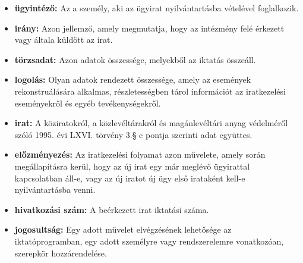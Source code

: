 \documentclass[
]{thesis-ekf}
\theoremstyle{definition}
\theoremstyle{remark}
\begin{document}
\begin{itemize}[leftmargin=0pt]
	\item[] \textbf{ügyintéző: }Az a személy, aki az ügyirat nyilvántartásba vételével foglalkozik.
	\item[] \textbf{irány: }Azon jellemző, amely megmutatja, hogy az intézmény felé érkezett vagy általa küldött  az irat.
	\item[] \textbf{törzsadat: }Azon adatok összessége, melyekből az iktatás összeáll.
	\item[] \textbf{logolás: }Olyan adatok rendezett összessége, amely az események rekonstruálására alkalmas, részletességben tárol információt az iratkezelési eseményekről és egyéb tevékenységekről.
	\item[] \textbf{irat: }A köziratokról, a közlevéltárakról és magánlevéltári anyag védelméről szóló 1995. évi LXVI. törvény 3.§ c pontja szerinti adat együttes.
	\item[] \textbf{előzményezés: }Az iratkezelési folyamat azon művelete, amely során megállapításra kerül, hogy az új irat egy már meglévő ügyirattal kapcsolatban áll-e, vagy az új iratot új ügy első irataként kell-e nyilvántartásba venni.
	\item[] \textbf{hivatkozási szám: }A beérkezett irat iktatási száma.
	\item[] \textbf{jogosultság:  }Egy adott művelet elvégzésének lehetősége az iktatóprogramban, egy adott személyre vagy rendszerelemre vonatkozóan, szerepkör hozzárendelése.
\end{itemize}
\end{document}
